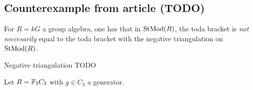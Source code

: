 \subsection{Counterexample from article (TODO)}

For \( R = kG \) a group algebra, one has that in \( \operatorname{StMod}(R) \), the toda bracket is \emph{not neccesarily} equal to the toda bracket with the negative triangulation on \( \operatorname{StMod}(R) \).

\begin{definition}
    Negative triangulation TODO
\end{definition}

Let \( R = {\mathbb{F}}_3C_3 \) with \( g \in C_3 \) a generator.
